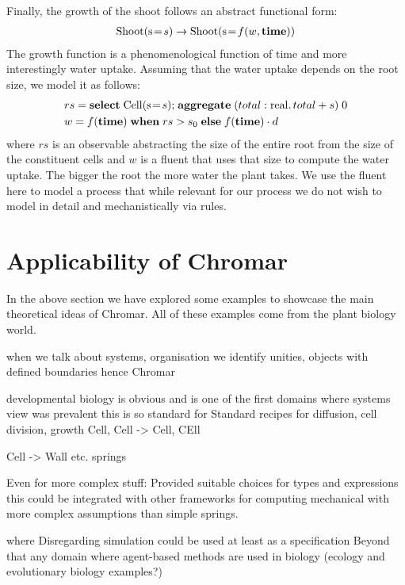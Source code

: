 Finally, the growth of the shoot follows an abstract functional form:
\begin{align*}
\mathrm{Shoot}(\mathrm{s} \! = \! {s}) \xrightarrow{} \mathrm{Shoot}(\mathrm{s} \! = \! {f(w, \mathbf{time})})
\end{align*}
The growth function is a phenomenological function of time and more
interestingly water uptake. Assuming that the water uptake depends on the root
size, we model it as follows:
\begin{align*}
& rs  = \mathbf{select} \; \mathrm{Cell}(\mathrm{s} \! = \! {s}) \mathbf{;} \; \mathbf{aggregate} \;
                                                              (total:
                                                              \mathrm{real}.\,
                                                              total + s) \; 0 \\
& w = f(\mathbf{time}) \; \mathbf{when} \; rs > s_0 \; \mathbf{else} \;
f(\mathbf{time}) \cdot d                                       
\end{align*}
where $rs$ is an observable abstracting the size of the entire root from the
size of the constituent cells and $w$ is a fluent that uses that size to compute
the water uptake. The bigger the root the more water the plant takes. We use the
fluent here to model a process that while relevant for our process we do not
wish to model in detail and mechanistically via rules.

\section{Applicability of Chromar}
In the above section we have explored some examples to showcase the main
theoretical ideas of Chromar. All of these examples come from the plant biology
world.

when we talk about systems, organisation we identify unities, objects with
defined boundaries hence Chromar

developmental biology is obvious and is one of the first domains where systems
view was prevalent
this is so standard for 
Standard recipes for diffusion, cell division, growth
Cell, Cell -> Cell, CEll

Cell -> Wall etc.
springs

Even for more complex stuff:
Provided suitable choices for types and expressions this could be integrated
with other frameworks for computing mechanical with more complex assumptions
than simple springs.


where Disregarding simulation could be used at least as a specification 
Beyond that any domain where agent-based methods are used in biology (ecology
and evolutionary biology examples?)


